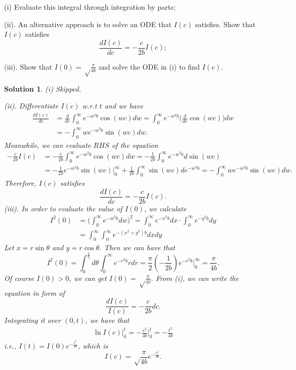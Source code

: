 \documentclass[6pt]{article}
\newtheorem{solution}{Solution}
\numberwithin{equation}{section}
\begin{document}
\begin{enumerate}
(i)  Evaluate this integral through integration by parts;

(ii).  An alternative approach is to solve an ODE that $I(c)$ satisfies.  Show that $I(c)$ satisfies
\[\frac{dI(c)}{dc}=-\frac{c}{2b}I(c);\]

(iii).  Show that $I(0)=\sqrt \frac{\pi}{4b}$ and solve the ODE in (i) to find $I(c)$.
\begin{solution}
(i) Skipped.

(ii). Differentiate $I(c)$ w.r.t $t$ and we have
\begin{align*}
\frac{dI(c)}{dc}&=\frac{d}{dc}\int_0^\infty e^{-w^2b} \cos (wc) dw=\int_0^\infty e^{-w^2b} \Big(\frac{d}{dc}\cos (wc)\Big) dw\\
&=-\int_0^\infty we^{-w^2b} \sin (wc) dw.
\end{align*}
Meanwhile, we can evaluate $RHS$ of the equation
\begin{align*}
-\frac{c}{2b}I(c)&=-\frac{c}{2b}\int_0^\infty e^{-w^2b} \cos (wc) dw=-\frac{1}{2b}\int_0^\infty e^{-w^2b} d\sin (wc) \\
&=-\frac{1}{2b}e^{-w^2b} \sin (wc)\Big\vert_0^\infty+\frac{1}{2b}\int_0^\infty  \sin (wc)de^{-w^2b}=-\int_0^\infty we^{-w^2b} \sin (wc) dw.
\end{align*}
Therefore, $I(c)$ satisfies
\[\frac{dI(c)}{dc}=-\frac{c}{2b}I(c).\]
(iii). In order to evaluate the value of $I(0)$, we calculate
\begin{align*}
I^2(0)&=\Big(\int_0^\infty e^{-w^2b} dw\Big)^2=\int_0^\infty e^{-x^2b} dx\cdot\int_0^\infty e^{-y^2b} dy\\
&=\int_0^\infty\int_0^\infty e^{-(x^2+y^2)b}dxdy
\end{align*}
Let $x=r\sin\theta$ and $y=r\cos\theta$. Then we can have that
\[I^2(0)=\int_0^{\frac{\pi}{2}}d\theta \int_0^\infty e^{-r^2 b}rdr=\frac{\pi}{2}(-\frac{1}{2b}) e^{-r^2 b}\Big\vert_0^\infty=\frac{\pi}{4b}.\]
Of course $I(0)>0$, we can get $I(0)=\sqrt \frac{\pi}{4b}$. From (i), we can write the equation in form of
\[\frac{dI(c)}{I(c)}=-\frac{c}{2b}dc.\]
Integrating it over $(0,t)$, we have that
\begin{align*}
\ln{I(c)}\Big\vert_0^t=-\frac{c^2}{4b}\Big\vert_0^t=-\frac{t^2}{4b}
\end{align*}
i.e., $I(t)=I(0)e^{-\frac{t^2}{4b}}$, which is
\[I(c)=\sqrt \frac{\pi}{4b}e^{-\frac{c^2}{4b}}.\]
\end{solution}


\end{enumerate}
\end{document}
